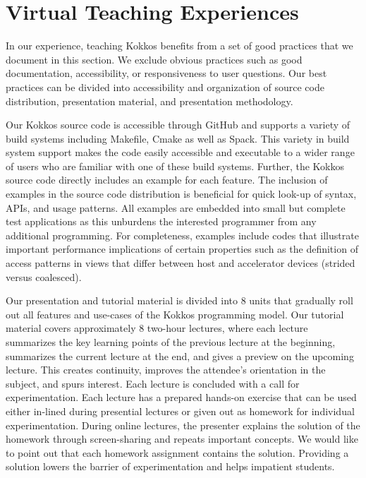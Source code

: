 \section{Virtual Teaching Experiences}\label{chap:teaching}

In our experience, teaching Kokkos benefits from a set of good practices that we document in this section. We exclude obvious practices such as good documentation, accessibility, or responsiveness to user questions. Our best practices can be divided into accessibility and organization of source code distribution, presentation material, and presentation methodology. 

Our Kokkos source code is accessible through GitHub and supports a variety of build systems including Makefile, Cmake as well as Spack\cite{SPACK}. This variety in build system support makes the code easily accessible and executable to a wider range of users who are familiar with one of these build systems. Further, the Kokkos source code directly includes an example for each feature. The inclusion of examples in the source code distribution is beneficial for quick look-up of syntax, APIs, and usage patterns. All examples are embedded into small but complete test applications as this unburdens the interested programmer from any additional programming. For completeness, examples include codes that illustrate important performance implications of certain properties such as the definition of access patterns in views that differ between host and accelerator devices (strided versus coalesced). 

Our presentation and tutorial material is divided into 8 units that gradually roll out all features and use-cases of the Kokkos programming model. Our tutorial material covers approximately 8 two-hour lectures, where each lecture summarizes the key learning points of the previous lecture at the beginning, summarizes the current lecture at the end, and gives a preview on the upcoming lecture. This creates continuity, improves the attendee's orientation in the subject, and spurs interest. Each lecture is concluded with a call for experimentation. Each lecture has a prepared hands-on exercise that can be used either in-lined during presential lectures or given out as homework for individual experimentation. During online lectures, the presenter explains the solution of the homework through screen-sharing and repeats important concepts. We would like to point out that each homework assignment contains the solution. Providing a solution lowers the barrier of experimentation and helps impatient students.

